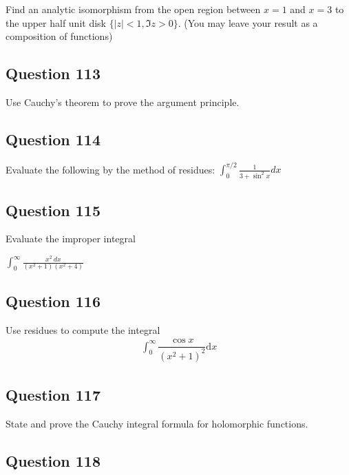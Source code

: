\documentclass[12pt]{article}
\begin{document}
Find an analytic isomorphism from the open region between \(x = 1\) and
\(x = 3\) to the upper half unit disk \(\{|z| < 1,\Im z > 0\}\). (You
may leave your result as a composition of functions)

\hypertarget{question-113-1}{%
\subsection{Question 113}\label{question-113-1}}

Use Cauchy's theorem to prove the argument principle.

\hypertarget{question-114-1}{%
\subsection{Question 114}\label{question-114-1}}

Evaluate the following by the method of residues:
\(\int_0^{\pi /2} \frac{1}{3+\sin^2x}dx\)

\hypertarget{question-115-1}{%
\subsection{Question 115}\label{question-115-1}}

Evaluate the improper integral

\(\int_0^\infty \frac{x^2~dx}{(x^2+1)(x^2+4)}\)

\hypertarget{question-116-1}{%
\subsection{Question 116}\label{question-116-1}}

Use residues to compute the integral \begin{align*}
\int_{0}^{\infty} \dfrac{\cos x}{(x^2+1)^2} \mathrm{d}x
\end{align*}

\hypertarget{question-117-1}{%
\subsection{Question 117}\label{question-117-1}}

State and prove the Cauchy integral formula for holomorphic functions.

\hypertarget{question-118-1}{%
\subsection{Question 118}\label{question-118-1}}
\end{document}
